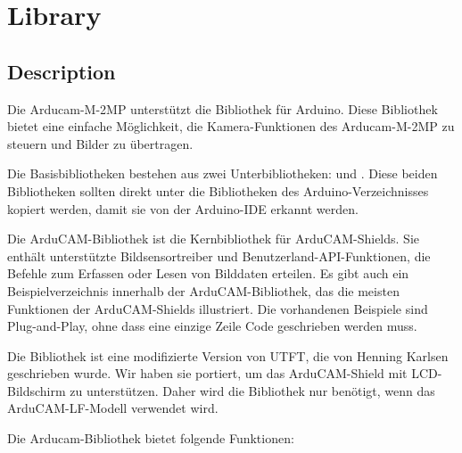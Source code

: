  

\section{Library }

\subsection{Description}

Die Arducam-M-2MP unterstützt die Bibliothek  für Arduino. Diese Bibliothek bietet eine einfache Möglichkeit, die Kamera-Funktionen des Arducam-M-2MP zu steuern und Bilder zu übertragen.

Die Basisbibliotheken bestehen aus zwei Unterbibliotheken:  und . Diese beiden Bibliotheken sollten direkt unter die Bibliotheken des Arduino-Verzeichnisses kopiert werden, damit sie von der Arduino-IDE erkannt werden.

Die ArduCAM-Bibliothek ist die Kernbibliothek für ArduCAM-Shields. Sie enthält unterstützte Bildsensortreiber und Benutzerland-API-Funktionen, die Befehle zum Erfassen oder Lesen von Bilddaten erteilen. Es gibt auch ein Beispielverzeichnis innerhalb der ArduCAM-Bibliothek, das die meisten Funktionen der ArduCAM-Shields illustriert. Die vorhandenen Beispiele sind Plug-and-Play, ohne dass eine einzige Zeile Code geschrieben werden muss.

Die Bibliothek  ist eine modifizierte Version von UTFT, die von Henning Karlsen geschrieben wurde. Wir haben sie portiert, um das ArduCAM-Shield mit LCD-Bildschirm zu unterstützen. Daher wird die Bibliothek  nur benötigt, wenn das ArduCAM-LF-Modell verwendet wird.


Die Arducam-Bibliothek bietet folgende Funktionen:

